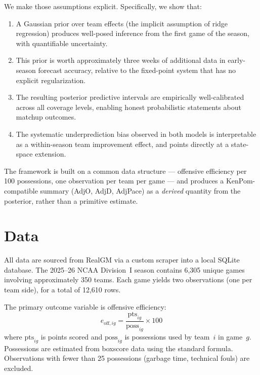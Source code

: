 \documentclass[11pt]{article}
\begin{document}
We make those assumptions explicit.  Specifically, we show that:

\begin{enumerate}
  \item A Gaussian prior over team effects (the implicit assumption of ridge
    regression) produces well-posed inference from the first game of the
    season, with quantifiable uncertainty.
  \item This prior is worth approximately three weeks of additional data in
    early-season forecast accuracy, relative to the fixed-point system that has
    no explicit regularization.
  \item The resulting posterior predictive intervals are empirically
    well-calibrated across all coverage levels, enabling honest probabilistic
    statements about matchup outcomes.
  \item The systematic underprediction bias observed in both models is
    interpretable as a within-season team improvement effect, and points
    directly at a state-space extension.
\end{enumerate}

The framework is built on a common data structure --- offensive efficiency
per 100 possessions, one observation per team per game --- and produces a
KenPom-compatible summary (AdjO, AdjD, AdjPace) as a \emph{derived} quantity
from the posterior, rather than a primitive estimate.

\section{Data}

All data are sourced from RealGM via a custom scraper into a local SQLite
database.  The 2025--26 NCAA Division~I season contains 6{,}305 unique games
involving approximately 350 teams.  Each game yields two observations (one per
team side), for a total of 12{,}610 rows.

The primary outcome variable is offensive efficiency:
\begin{equation}
  e_{\text{off},ig} = \frac{\text{pts}_{ig}}{\text{poss}_{ig}} \times 100
  \label{eq:eoff}
\end{equation}
where $\text{pts}_{ig}$ is points scored and $\text{poss}_{ig}$ is possessions
used by team~$i$ in game~$g$.  Possessions are estimated from boxscore data
using the standard formula.  Observations with fewer than 25 possessions
(garbage time, technical fouls) are excluded.
\end{document}
